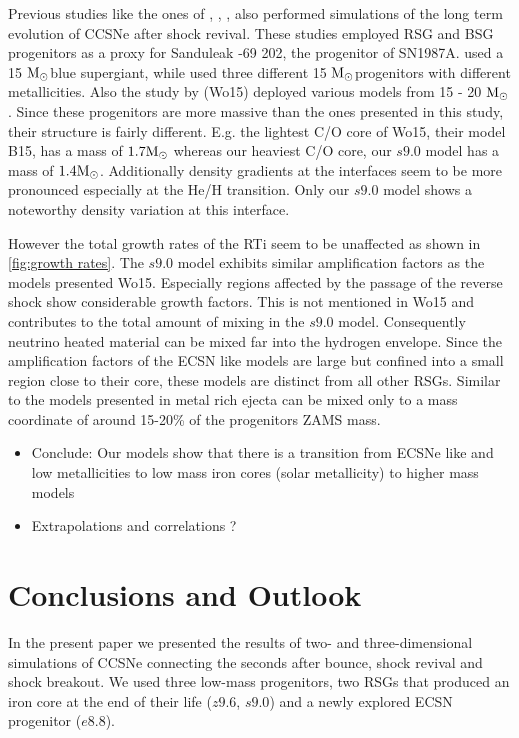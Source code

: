 \documentclass[fleqn,usenatbib]{mnras}
\newcommand{\solm}{\xspace\ensuremath{\rm{M_{\odot}}}}
\newcommand{\COM}[1]{{\color{red}#1}}
\begin{document}
Previous studies like the ones of \cite{Hammer2010}, \cite{Joggerst2010}, \citet{Wongwathanarat2015}, \citet{Kifonidis2005} also performed simulations of the long term evolution of CCSNe after shock revival. These studies employed RSG and BSG progenitors as a proxy for Sanduleak -69 202, the progenitor of SN1987A. \citet{Hammer2010} used a 15 \solm blue supergiant, while \citet{Joggerst2010} used three different 15 \solm progenitors with different metallicities. Also the study by
\citet{Wongwathanarat2015} (Wo15) deployed various models from 15 - 20 \solm. 
Since these progenitors are more massive than the ones presented in this study, their structure is fairly different. E.g. the lightest C/O core of Wo15, their model B15, has a mass of $1.7\solm$ whereas our heaviest C/O core, our $s9.0$ model has a mass of $1.4\solm$. Additionally density gradients at the interfaces seem to be more pronounced especially at the He/H transition. Only our $s9.0$ model shows a noteworthy density variation at this interface.

However the total growth rates of the RTi seem to be unaffected as shown in \autoref{fig:growth rates}. The $s9.0$ model exhibits similar amplification factors as the models presented Wo15. Especially regions affected by the passage of the reverse shock show considerable growth factors. This is not mentioned in Wo15 and contributes to the total amount of mixing in the $s9.0$ model. Consequently neutrino heated material can be mixed far into the hydrogen envelope. 
Since the amplification factors of the ECSN like models are large but confined into a small region close to their core, these models are distinct from all other RSGs. Similar to the models presented in \citet{Joggerst2010} metal rich ejecta can be mixed only to a mass coordinate of around 15-20\% of the progenitors ZAMS mass.
\COM{
\begin{itemize}
    \item Conclude: Our models show that there is a transition from ECSNe like and low metallicities to low mass iron cores (solar metallicity) to higher mass models
    \item Extrapolations and correlations ?
\end{itemize}
}

\section{Conclusions and Outlook}
In the present paper we presented the results of two- and three-dimensional simulations of CCSNe connecting the seconds after bounce, shock revival and shock breakout. We used three low-mass progenitors, two RSGs that produced an iron core at the end of their life ($z9.6$, $s9.0$) and a newly explored ECSN progenitor ($e8.8$). 
\end{document}
